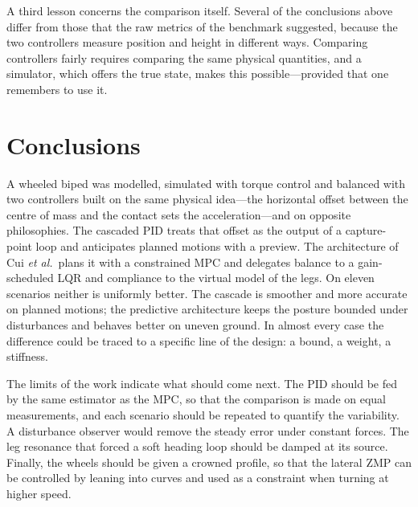 \documentclass[11pt,a4paper]{article}
\begin{document}
A third lesson concerns the comparison itself. Several of the conclusions above differ from those that the raw
metrics of the benchmark suggested, because the two controllers measure position and height in different ways.
Comparing controllers fairly requires comparing the same physical quantities, and a simulator, which offers the true
state, makes this possible---provided that one remembers to use it.


\section{Conclusions}

A wheeled biped was modelled, simulated with torque control and balanced with two controllers built on the same
physical idea---the horizontal offset between the centre of mass and the contact sets the acceleration---and on
opposite philosophies. The cascaded PID treats that offset as the output of a capture-point loop and anticipates
planned motions with a preview. The architecture of Cui \emph{et al.}\ plans it with a constrained MPC and delegates
balance to a gain-scheduled LQR and compliance to the virtual model of the legs. On eleven scenarios neither is
uniformly better. The cascade is smoother and more accurate on planned motions; the predictive architecture keeps
the posture bounded under disturbances and behaves better on uneven ground. In almost every case the difference
could be traced to a specific line of the design: a bound, a weight, a stiffness.

The limits of the work indicate what should come next. The PID should be fed by the same estimator as the MPC, so
that the comparison is made on equal measurements, and each scenario should be repeated to quantify the variability.
A disturbance observer would remove the steady error under constant forces. The leg resonance that forced a soft
heading loop should be damped at its source. Finally, the wheels should be given a crowned profile, so that the
lateral ZMP can be controlled by leaning into curves and used as a constraint when turning at higher speed.
\end{document}
